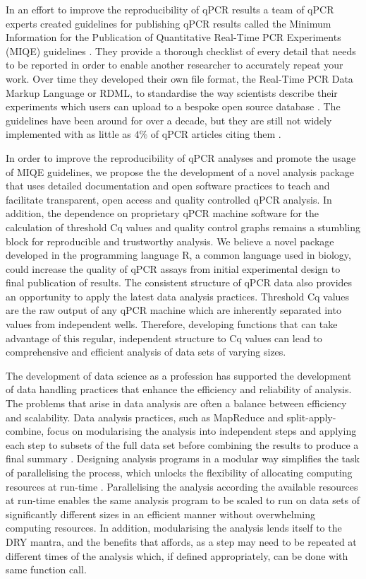 \documentclass[../main.tex]{subfiles}
\begin{document}
In an effort to improve the reproducibility of qPCR results a team of qPCR experts created guidelines for publishing qPCR results called the Minimum Information for the Publication of Quantitative Real-Time PCR Experiments (MIQE) guidelines \parencite{Bustin2009}.
They provide a thorough checklist of every detail that needs to be reported in order to enable another researcher to accurately repeat your work. 
Over time they developed their own file format, the Real-Time PCR Data Markup Language or RDML, to standardise the way scientists describe their experiments which users can upload to a bespoke open source database \parencite{Lefever2009, Ruijter2015}.
The guidelines have been around for over a decade, but they are still not widely implemented with as little as $4\%$ of qPCR articles citing them \parencite{AbdelNour2020}.

In order to improve the reproducibility of qPCR analyses and promote the usage of MIQE guidelines, we propose the the development of a novel analysis package that uses detailed documentation and open software practices to teach and facilitate transparent, open access and quality controlled qPCR analysis. 
In addition, the dependence on proprietary qPCR machine software for the calculation of threshold Cq values and quality control graphs remains a stumbling block for reproducible and trustworthy analysis. 
We believe a novel package developed in the programming language R, a common language used in biology, could increase the quality of qPCR assays from initial experimental design to final publication of results.
The consistent structure of qPCR data also provides an opportunity to apply the latest data analysis practices.
Threshold Cq values are the raw output of any qPCR machine which are inherently separated into values from independent wells. 
Therefore, developing functions that can take advantage of this regular, independent structure to Cq values can lead to comprehensive and efficient analysis of data sets of varying sizes.


The development of data science as a profession has supported the development of data handling practices that enhance the efficiency and reliability of analysis.
The problems that arise in data analysis are often a balance between efficiency and scalability.
Data analysis practices, such as MapReduce and split-apply-combine, focus on modularising the analysis into independent steps and applying each step to subsets of the full data set before combining the results to produce a final summary \parencite{Wickham2011,Dean2004}.
Designing analysis programs in a modular way simplifies the task of parallelising the process, which unlocks the flexibility of allocating computing resources at run-time \parencite{Chua2004}.
Parallelising the analysis according the available resources at run-time enables the same analysis program to be scaled to run on data sets of significantly different sizes in an efficient manner without overwhelming computing resources.
In addition, modularising the analysis lends itself to the DRY mantra, and the benefits that affords, as a step may need to be repeated at different times of the analysis which, if defined appropriately, can be done with same function call.
\end{document}

